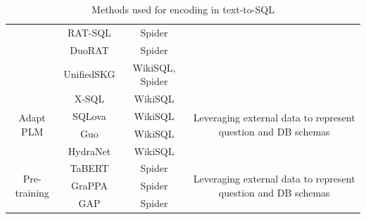 \begin{table}
\begin{tabular}{|c|c|c|c|}
                                        & RAT-SQL             & Spider                    &                                                                                                            \\
                                        & DuoRAT              & Spider                    &                                                                                                            \\
                                        & UnifiedSKG          & WikiSQL, Spider           &                                                                                                            \\
        \hline
        \multirow{4}{*}{Adapt PLM}      & X-SQL               & WikiSQL                   & \multirow{4}{*}{\parbox{5cm}{Leveraging external data to represent question and DB schemas}}               \\
                                        & SQLova              & WikiSQL                   &                                                                                                            \\
                                        & Guo                 & WikiSQL                   &                                                                                                            \\
                                        & HydraNet            & WikiSQL                   &                                                                                                            \\
        \hline
        \multirow{3}{*}{Pre-training}   & TaBERT              & Spider                    & \multirow{3}{*}{\parbox{5cm}{Leveraging external data to represent question and DB schemas}}               \\
                                        & GraPPA              & Spider                    &                                                                                                            \\
                                        & GAP                 & Spider                    &                                                                                                            \\
        \hline
    \end{tabular}
    \caption{Methods used for encoding in text-to-SQL \cite{deng2022recent}}
    \label{tab:methods}
\end{table}







